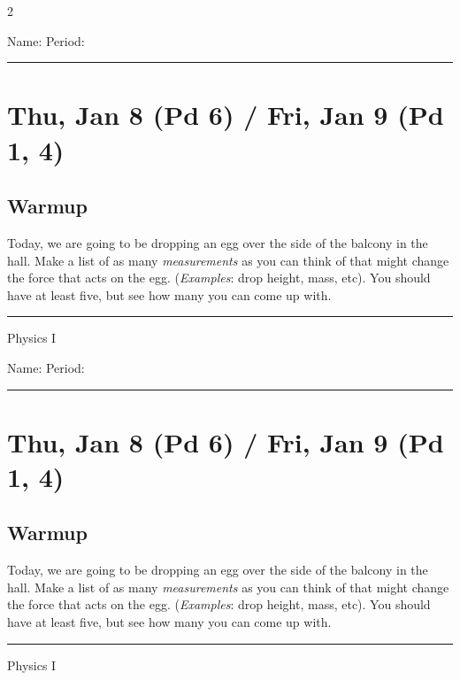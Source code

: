 \documentclass[10pt,landscape]{exam}
\def\todayDate{Thu, Jan 8 (Pd 6) / Fri, Jan 9 (Pd 1, 4)}
\def\content{
    Today, we are going to be dropping an egg over the side of the balcony in the hall.  Make a list of as many \emph{measurements} as you can think of that might change the force that acts on the egg.  (\emph{Examples}: drop height, mass, etc).  You should have at least five, but see how many you can come up with.
}
\begin{document}
\pagestyle{empty}

\setlength{\columnsep}{0.8in}
\begin{multicols*}{2}

\noindent  
Name: \hfill Period: \hspace{5em}
\vspace{0.5em}
\hrule

\section*{\todayDate}
\subsection*{Warmup}

\content

\vfill
\hrule
\vspace{0.5em}
\hfill {\sc Physics I}

\columnbreak

\noindent  
Name: \hfill Period: \hspace{5em}
\vspace{0.5em}
\hrule

\section*{\todayDate}
\subsection*{Warmup}

\content

\vfill
\hrule
\vspace{0.5em}
\hfill {\sc Physics I}

\end{multicols*}
\end{document}
